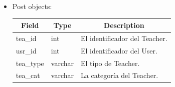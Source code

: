 \documentclass{article}
\begin{document}
\begin{enumerate}
\begin{itemize}
        \item Post objects: \begin{table}[H] \centering \begin{tabular}{|l|l|l|}
        \hline \multicolumn{1}{|c|}{\textbf{Field}} &
        \multicolumn{1}{c|}{\textbf{Type}} &
        \multicolumn{1}{c|}{\textbf{Description}} \\ \hline tea\_id & int & El
        identificador del Teacher. \\ \hline usr\_id & int & El identificador
        del User. \\ \hline tea\_type & varchar & El tipo de Teacher. \\ \hline
        tea\_cat & varchar & La categoría del Teacher. \\ \hline \end{tabular}
        \end{table}
    \end{itemize}


\end{enumerate}
\end{document}
